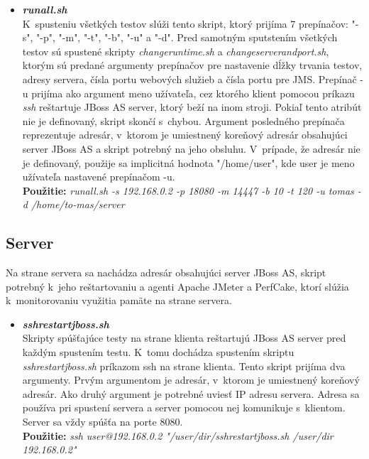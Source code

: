 \documentclass[12pt,oneside,final]{fithesis-utf8}
\newcommand\underscore[1]{\underline{\hspace{8pt}}}
\begin{document}
\begin{itemize}
\item \textit{\textbf{run\underscore{}all.sh}}\\
K~spusteniu všetkých testov slúži tento skript, ktorý prijíma 7 prepínačov: "{}-s"{}, "{}-p"{}, "{}-m"{}, "{}-t"{}, "{}-b"{}, "{}-u"{} a "{}-d"{}. Pred samotným sputstením všetkých testov sú spustené skripty \textit{change\underscore{}runtime.sh} a \textit{change\underscore{}server\underscore{}and\underscore{}port.sh}, ktorým sú predané argumenty prepínačov pre nastavenie dĺžky trvania testov, adresy servera, čísla portu webových služieb a čísla portu pre JMS. Prepínač -u prijíma ako argument meno užívateľa, cez ktorého klient pomocou príkazu \textit{ssh} reštartuje JBoss AS server, ktorý beží na inom stroji. Pokiaľ tento atribút nie je definovaný, skript skončí s~chybou. Argument posledného prepínača reprezentuje adresár, v~ktorom je umiestnený koreňový adresár obsahujúci server JBoss AS a skript potrebný na jeho obsluhu. V~prípade, že adresár nie je definovaný, použije sa implicitná hodnota "{/home/user}"{}, kde user je meno užívateľa nastavené prepínačom -u.\\
\textbf{Použitie:} \textit{run\underscore{}all.sh -s 192.168.0.2 -p 18080 -m 14447 -b 10 -t 120 -u tomas -d /home/to-mas/server}

\end{itemize}


\subsection{Server}
Na strane servera sa nachádza adresár obsahujúci server JBoss AS, skript potrebný k~jeho reštartovaniu a agenti Apache JMeter a PerfCake, ktorí slúžia k~monitorovaniu využitia pamäte na strane servera.

\begin{itemize}

\item \textit{\textbf{ssh\underscore{}restart\underscore{}jboss.sh}}\\
Skripty spúšťajúce testy na strane klienta reštartujú JBoss AS server pred každým spustením testu. K~tomu dochádza spustením skriptu \textit{ssh\underscore{}restart\underscore{}jboss.sh} príkazom ssh na strane klienta. Tento skript prijíma dva argumenty. Prvým argumentom je adresár, v~ktorom je umiestnený koreňový adresár. Ako druhý argument je potrebné uviesť IP adresu servera. Adresa sa používa pri spustení servera a server pomocou nej komunikuje s~klientom. Server sa vždy spúšťa na porte 8080.\\
\textbf{Použitie:} \textit{ssh user@192.168.0.2 "/user/dir/ssh\underscore{}restart\underscore{}jboss.sh /user/dir 192.168.0.2"}
\end{itemize}
\end{document}
